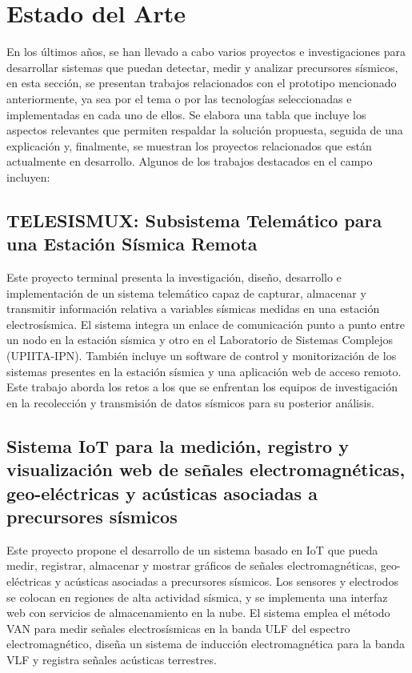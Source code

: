  \section{Estado del Arte  }
 En los últimos años, se han llevado a cabo varios proyectos e investigaciones para desarrollar sistemas que puedan detectar, medir y analizar precursores sísmicos, en esta sección, se presentan trabajos relacionados con el prototipo mencionado anteriormente, ya sea por el tema o por las tecnologías seleccionadas e implementadas en cada uno de ellos. Se elabora una tabla que incluye los aspectos relevantes que permiten respaldar la solución propuesta, seguida de una explicación y, finalmente, se muestran los proyectos relacionados que están actualmente en desarrollo. Algunos de los trabajos destacados en el campo incluyen:
 \subsection{TELESISMUX: Subsistema Telemático para una Estación Sísmica Remota }
 Este proyecto terminal presenta la investigación, diseño, desarrollo e implementación de un sistema telemático capaz de capturar, almacenar y transmitir información relativa a variables sísmicas medidas en una estación electrosísmica. El sistema integra un enlace de comunicación punto a punto entre un nodo en la estación sísmica y otro en el Laboratorio de Sistemas Complejos (UPIITA-IPN). También incluye un software de control y monitorización de los sistemas presentes en la estación sísmica y una aplicación web de acceso remoto. Este trabajo aborda los retos a los que se enfrentan los equipos de investigación en la recolección y transmisión de datos sísmicos para su posterior análisis. ~\cite{Valencia2012}
\subsection{Sistema IoT para la medición, registro y visualización web de señales electromagnéticas, geo-eléctricas y acústicas asociadas a precursores sísmicos}
Este proyecto propone el desarrollo de un sistema basado en IoT que pueda medir, registrar, almacenar y mostrar gráficos de señales electromagnéticas, geo-eléctricas y acústicas asociadas a precursores sísmicos. Los sensores y electrodos se colocan en regiones de alta actividad sísmica, y se implementa una interfaz web con servicios de almacenamiento en la nube. El sistema emplea el método VAN para medir señales electrosísmicas en la banda ULF del espectro electromagnético, diseña un sistema de inducción electromagnética para la banda VLF y registra señales acústicas terrestres. ~\cite{PerezS2022}
